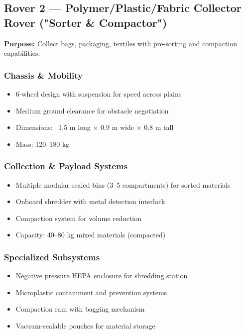 \documentclass[12pt, a4paper]{article}
\begin{document}
\subsection{Rover 2 — Polymer/Plastic/Fabric Collector Rover ("Sorter \& Compactor")}

\textbf{Purpose:} Collect bags, packaging, textiles with pre-sorting and compaction capabilities.

\subsubsection{Chassis \& Mobility}
\begin{itemize}
    \item 6-wheel design with suspension for speed across plains
    \item Medium ground clearance for obstacle negotiation
    \item Dimensions: ~1.5 m long × 0.9 m wide × 0.8 m tall
    \item Mass: 120–180 kg
\end{itemize}

\subsubsection{Collection \& Payload Systems}
\begin{itemize}
    \item Multiple modular sealed bins (3–5 compartments) for sorted materials
    \item Onboard shredder with metal detection interlock
    \item Compaction system for volume reduction
    \item Capacity: 40–80 kg mixed materials (compacted)
\end{itemize}

\subsubsection{Specialized Subsystems}
\begin{itemize}
    \item Negative pressure HEPA enclosure for shredding station
    \item Microplastic containment and prevention systems
    \item Compaction ram with bagging mechanism
    \item Vacuum-sealable pouches for material storage
\end{itemize}
\end{document}
